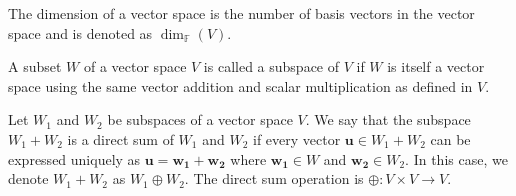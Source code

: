 \documentclass[a4paper]{article}
\begin{document}
\begin{defi}[Dimension]
The dimension of a vector space is the number of basis vectors in the vector space and is denoted as $\dim_{\mathbb{F}}(V)$.
\end{defi}
\begin{defi}[Subspaces]
A subset $W$ of a vector space $V$ is called a subspace of $V$ if $W$ is itself a vector space using the same vector addition and scalar multiplication as defined in $V$.
\end{defi}
\begin{defi}
Let $W_1$ and $W_2$ be subspaces of a vector space $V$. We say that the subspace $W_1+W_2$ is a direct sum of $W_1$ and $W_2$ if every vector $\mathbf{u}\in W_1+W_2$ can be expressed uniquely as $\mathbf{u}=\mathbf{w_1}+\mathbf{w_2}$ where $\mathbf{w_1}\in W$ and $\mathbf{w_2}\in W_2$. In this case, we denote $W_1+W_2$ as $W_1\oplus W_2$. The direct sum operation is $\oplus: V\times V\rightarrow V$.
\end{defi}
\end{document}
